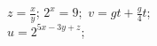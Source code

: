 \documentclass{article}
\begin{document}
\begin{tabenum}[\bfseries1)]
\tabenumitem $z=\displaystyle\frac xy$;
\tabenumitem $2^x=9;$\cr
\tabenumitem $v=gt+\displaystyle\frac{g}{4}t$;\\[1ex]
\tabenumitem $u=2^{5x-3y+z}$;
\end{tabenum}
\end{document}
